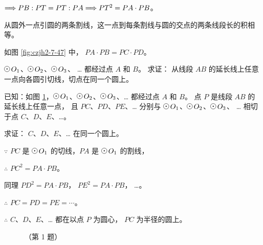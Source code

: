 \quad $\Longrightarrow PB : PT = PT : PA  \Longrightarrow PT^2 = PA \cdot PB$。


\begin{tuilun}[推论]
    从圆外一点引圆的两条割线，这一点到每条割线与圆的交点的两条线段长的积相等。
\end{tuilun}

如图 \ref{fig:czjh2-7-47} 中， $PA \cdot PB = PC \cdot PD$。

\liti $\yuan\,O_1$、$\yuan\,O_2$、$\yuan\,O_3$、 … 都经过点 $A$ 和 $B$。
求证： 从线段 $AB$ 的延长线上任意一点向各圆引切线，切点在同一个圆上。

已知：如图 \ref{fig:czjh2-7-48}，$\yuan\,O_1$、$\yuan\,O_2$、$\yuan\,O_3$、… 都经过点 $A$ 和 $B$。
点 $P$ 是线段 $AB$ 的延长线上任意一点， 且 $PC$、$PD$、$PE$、… 分别与
$\yuan\,O_1$、$\yuan\,O_2$、$\yuan\,O_3$、 … 相切于点 $C$、$D$、$E$、…。

求证： $C$、$D$、$E$、… 在同一个圆上。

\zhengming $\because$ \quad $PC$ 是 $\yuan\,O_1$ 的切线，$PA$ 是 $\yuan\,O_1$ 的割线，

$\therefore$ \quad $PC^2 = PA \cdot PB$。

同理 $PD^2 = PA \cdot PB$， $PE^2 = PA \cdot PB$， …。

$\therefore$ \quad $PC = PD = PE = \cdots$。

$\therefore$ \quad $C$、$D$、$E$、… 都在以点 $P$ 为圆心， $PC$ 为半径的圆上。

\begin{figure}[htbp]
    \centering
    \begin{minipage}[b]{7cm}
        \centering
        
        \caption{}\label{fig:czjh2-7-48}
    \end{minipage}
    \qquad
    \begin{minipage}[b]{7cm}
        \centering
        
        \caption*{（第 1 题）}
    \end{minipage}
\end{figure}


\begin{lianxi}



\end{lianxi}

